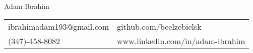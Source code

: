 \documentclass{article}
\newcommand{\name}[1]{{\huge #1} \vspace{10pt}}
\begin{document}


\begin{center}
	\name{Adam Ibrahim}

  {\setlength{\tabcolsep}{0pt}
    \begin{tabu} to \textwidth {XX[r]}
      ibrahimadam193@gmail.com  &  github.com/beelzebielsk \\
      (347)-458-8082 &             www.linkedin.com/in/adam-ibrahim 
    \end{tabu}
  }
\end{center}
\end{document}
